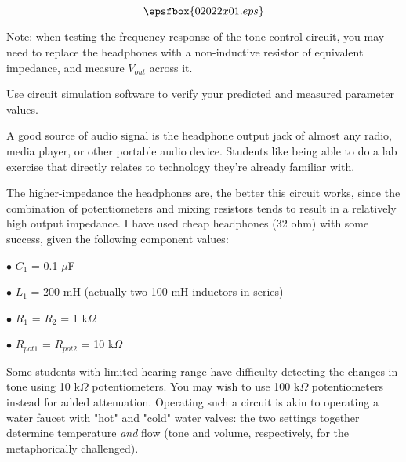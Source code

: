 

$$\epsfbox{02022x01.eps}$$

Note: when testing the frequency response of the tone control circuit, you may need to replace the headphones with a non-inductive resistor of equivalent impedance, and measure $V_{out}$ across it. 

\vfil \eject






Use circuit simulation software to verify your predicted and measured parameter values.







A good source of audio signal is the headphone output jack of almost any radio, media player, or other portable audio device.  Students like being able to do a lab exercise that directly relates to technology they're already familiar with.

The higher-impedance the headphones are, the better this circuit works, since the combination of potentiometers and mixing resistors tends to result in a relatively high output impedance.  I have used cheap headphones (32 ohm) with some success, given the following component values:

\medskip
\item{$\bullet$} $C_1$ = 0.1 $\mu$F 
\item{$\bullet$} $L_1$ = 200 mH (actually two 100 mH inductors in series)
\item{$\bullet$} $R_1$ = $R_2$ = 1 k$\Omega$
\item{$\bullet$} $R_{pot1}$ = $R_{pot2}$ = 10 k$\Omega$
\medskip

Some students with limited hearing range have difficulty detecting the changes in tone using 10 k$\Omega$ potentiometers.  You may wish to use 100 k$\Omega$ potentiometers instead for added attenuation.  Operating such a circuit is akin to operating a water faucet with "hot" and "cold" water valves: the two settings together determine temperature {\it and} flow (tone and volume, respectively, for the metaphorically challenged).

